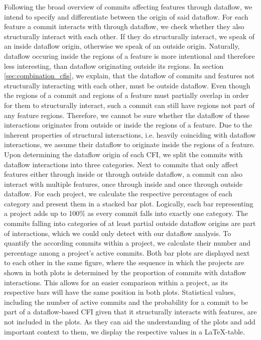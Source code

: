 Following the broad overview of commits affecting features through dataflow, we intend to specify and differentiate between the origin of said dataflow.
For each feature a commit interacts with through dataflow, we check whether they also structurally interact with each other.
If they do structurally interact, we speak of an inside dataflow origin, otherwise we speak of an outside origin.
Naturally, dataflow occuring inside the regions of a feature is more intentional and therefore less interesting, than dataflow originating outside its regions.
In section \ref{sec:combination_cfis}, we explain, that the dataflow of commits and features not structurally interacting with each other, must be outside dataflow.
Even though the regions of a commit and regions of a feature must partially overlap in order for them to structurally interact, such a commit can still have regions not part of any feature regions.
Therefore, we cannot be sure whether the dataflow of these interactions originates from outside or inside the regions of a feature.
Due to the inherent properties of structural interactions, i.e. heavily coinciding with dataflow interactions, we assume their dataflow to originate inside the regions of a feature.
Upon determining the dataflow origin of each CFI, we split the commits with dataflow interactions into three categories.
Next to commits that only affect features either through inside or through outside dataflow, a commit can also interact with multiple features, once through inside and once through outside dataflow.
For each project, we calculate the respective percentages of each category and present them in a stacked bar plot.
Logically, each bar representing a project adds up to 100\% as every commit falls into exactly one category.
The commits falling into categories of at least partial outside dataflow origins are part of interactions, which we could only detect with our dataflow analysis.
To quantify the according commits within a project, we calculate their number and percentage among a project's active commits.
Both bar plots are displayed next to each other in the same figure, where the sequence in which the projects are shown in both plots is determined by the proportion of commits with dataflow interactions.
This allows for an easier comparison within a project, as its respective bars will have the same position in both plots.
Statistical values, including the number of active commits and the probability for a commit to be part of a dataflow-based CFI given that it structurally interacts with features, are not included in the plots.
As they can aid the understanding of the plots and add important context to them, we display the respective values in a \LaTeX-table.

